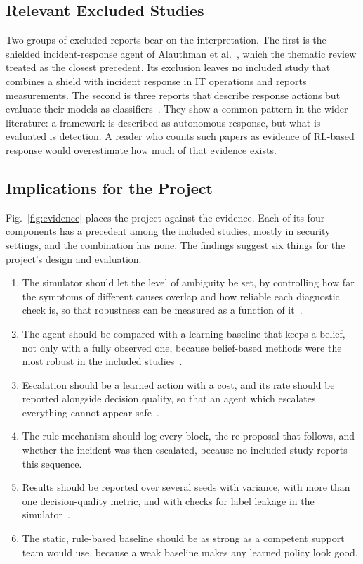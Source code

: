 \subsection{Relevant Excluded Studies}

Two groups of excluded reports bear on the interpretation. The first is the shielded incident-response agent of Alauthman et al.~\cite{alauthman2026}, which the thematic review treated as the closest precedent. Its exclusion leaves no included study that combines a shield with incident response in IT operations and reports measurements. The second is three reports that describe response actions but evaluate their models as classifiers~\cite{manojkumar2026,bompally2026,reddyavula2026}. They show a common pattern in the wider literature: a framework is described as autonomous response, but what is evaluated is detection. A reader who counts such papers as evidence of RL-based response would overestimate how much of that evidence exists.

\subsection{Implications for the Project}

Fig.~\ref{fig:evidence} places the project against the evidence. Each of its four components has a precedent among the included studies, mostly in security settings, and the combination has none. The findings suggest six things for the project's design and evaluation.

\begin{enumerate}
\item The simulator should let the level of ambiguity be set, by controlling how far the symptoms of different causes overlap and how reliable each diagnostic check is, so that robustness can be measured as a function of it~\cite{sahin2026,contractor2025}.
\item The agent should be compared with a learning baseline that keeps a belief, not only with a fully observed one, because belief-based methods were the most robust in the included studies~\cite{hammar2025,hammar2026belief}.
\item Escalation should be a learned action with a cost, and its rate should be reported alongside decision quality, so that an agent which escalates everything cannot appear safe~\cite{kovtun2026,turan2026}.
\item The rule mechanism should log every block, the re-proposal that follows, and whether the incident was then escalated, because no included study reports this sequence.
\item Results should be reported over several seeds with variance, with more than one decision-quality metric, and with checks for label leakage in the simulator~\cite{okafor2026,sahin2026}.
\item The static, rule-based baseline should be as strong as a competent support team would use, because a weak baseline makes any learned policy look good.
\end{enumerate}

